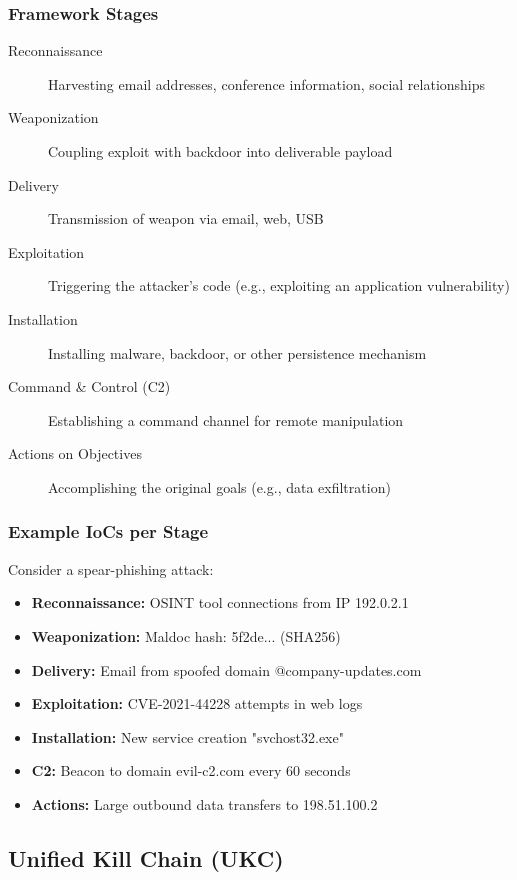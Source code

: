 \subsubsection{Framework Stages}
\begin{description}
    \item[Reconnaissance] Harvesting email addresses, conference information, social relationships
    \item[Weaponization] Coupling exploit with backdoor into deliverable payload
    \item[Delivery] Transmission of weapon via email, web, USB
    \item[Exploitation] Triggering the attacker's code (e.g., exploiting an application vulnerability)
    \item[Installation] Installing malware, backdoor, or other persistence mechanism
    \item[Command \& Control (C2)] Establishing a command channel for remote manipulation
    \item[Actions on Objectives] Accomplishing the original goals (e.g., data exfiltration)
\end{description}

\subsubsection{Example IoCs per Stage}
Consider a spear-phishing attack:
\begin{itemize}
    \item \textbf{Reconnaissance:} OSINT tool connections from IP 192.0.2.1
    \item \textbf{Weaponization:} Maldoc hash: 5f2de... (SHA256)
    \item \textbf{Delivery:} Email from spoofed domain @company-updates.com
    \item \textbf{Exploitation:} CVE-2021-44228 attempts in web logs
    \item \textbf{Installation:} New service creation "svchost32.exe"
    \item \textbf{C2:} Beacon to domain evil-c2.com every 60 seconds
    \item \textbf{Actions:} Large outbound data transfers to 198.51.100.2
\end{itemize}

\subsection{Unified Kill Chain (UKC)}

